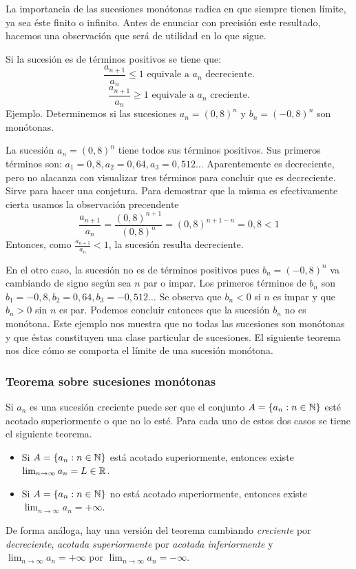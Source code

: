 \documentclass[../Teoría.root.tex]{subfiles}
\begin{document}
La importancia de las sucesiones monótonas radica en que siempre tienen límite, ya sea éste finito o infinito.
Antes de enunciar con precisión este resultado, hacemos una observación que será de utilidad en lo que sigue.

Si la sucesión es de términos positivos se tiene que:
\[\frac{a_{n+1}}{a_n}\leq1\text{ equivale a \(a_n\) decreciente.}\]
\[\frac{a_{n+1}}{a_n}\geq1\text{ equivale a \(a_n\) creciente.}\]
Ejemplo.
Determinemos si las sucesiones \(a_n=(0,8)^n\) y \(b_n=(-0,8)^n\) son monótonas.

La sucesión \(a_n=(0,8)^n\) tiene todos sus términos positivos.
Sus primeros términos son: \(a_1=0,8, a_2=0,64, a_3=0,512\dots\) Aparentemente es decreciente, pero no alacanza con visualizar tres términos para concluir que es decreciente.
Sirve para hacer una conjetura.
Para demostrar que la misma es efectivamente cierta usamos la observación precendente
\[\frac{a_{n+1}}{a_n}=\frac{(0,8)^{n+1}}{(0,8)^n}=(0,8)^{n+1-n}=0,8<1\]
Entonces, como \(\frac{a_{n+1}}{a_n}<1\), la sucesión resulta decreciente.

En el otro caso, la sucesión no es de términos positivos pues \(b_n=(-0,8)^n\) va cambiando de signo según sea \(n\) par o impar.
Los primeros términos de \(b_n\) son \(b_1=-0,8, b_2=0,64, b_3=-0,512\dots\) Se observa que \(b_n<0\) si \(n\) es impar y que \(b_n>0\) sin \(n\) es par.
Podemos concluir entonces que la sucesión \(b_n\) no es monótona.
Este ejemplo nos muestra que no todas las sucesiones son monótonas y que éstas constituyen una clase particular de sucesiones.
El siguiente teorema nos dice cómo se comporta el límite de una sucesión monótona.
\subsubsection{Teorema sobre sucesiones monótonas}
Si \(a_n\) es una sucesión creciente puede ser que el conjunto \(A=\{a_n:n\in\mathbb{N}\}\) esté acotado superiormente o que no lo esté.
Para cada uno de estos dos casos se tiene el siguiente teorema.
\begin{itemize}
    \item Si \(A=\{a_n:n\in\mathbb{N}\}\) está acotado superiormente, entonces existe \(\lim_{n\to\infty}a_n=L\in\mathbb{R}\).
    \item Si \(A=\{a_n:n\in\mathbb{N}\}\) no está acotado superiormente, entonces existe \(\lim_{n\to\infty}a_n=+\infty\).
\end{itemize}
De forma análoga, hay una versión del teorema cambiando \textit{creciente} por \textit{decreciente}, \textit{acotada superiormente} por \textit{acotada inferiormente} y \(\lim_{n\to\infty}a_n=+\infty\) por \(\lim_{n\to\infty}a_n=-\infty\).
\end{document}
